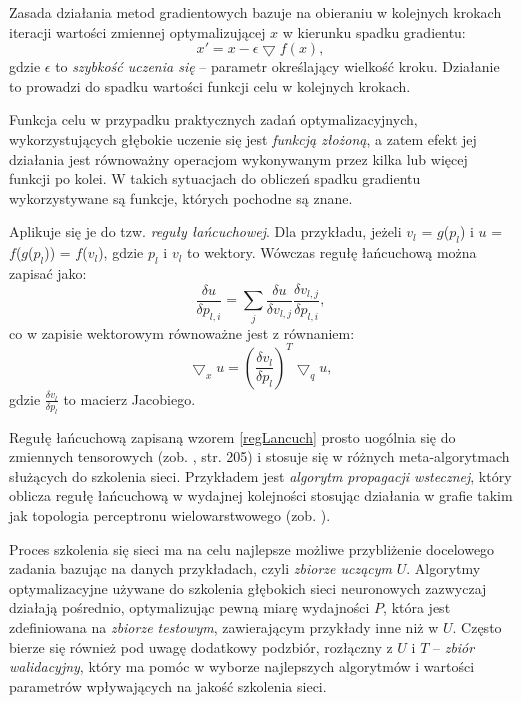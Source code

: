 Zasada działania metod gradientowych bazuje na obieraniu w kolejnych krokach iteracji wartości zmiennej optymalizującej $x$ w kierunku spadku gradientu:
\begin{equation}
x' = x - \epsilon \bigtriangledown f(x),
\end{equation} 
gdzie $\epsilon$ to \textit{szybkość uczenia się} -- parametr określający wielkość kroku. Działanie to prowadzi do spadku wartości funkcji celu w kolejnych krokach. 

Funkcja celu w przypadku praktycznych zadań optymalizacyjnych, wykorzystujących głębokie uczenie się jest \textit{funkcją złożoną}, a zatem efekt jej działania jest równoważny operacjom wykonywanym przez kilka lub więcej funkcji po kolei. \linebreak W takich sytuacjach do obliczeń spadku gradientu wykorzystywane są funkcje, których pochodne są znane.

Aplikuje się je do tzw. \textit{reguły łańcuchowej}. Dla przykładu, jeżeli $v_l$ = $g$($p_l$) i $u$ = $f$($g$($p_l$)) = $f$($v_l$), gdzie $p_l$ i $v_l$ to wektory. Wówczas regułę łańcuchową można zapisać jako:
\begin{equation}
\frac{\delta u}{\delta p_{l,i}} = \sum_{j} \frac{\delta u}{\delta v_{l,j}} \frac{\delta v_{l,j}}{\delta p_{l,i}}, 
\end{equation}
co w zapisie wektorowym równoważne jest z równaniem:
\begin{equation}
\label{regLancuch}
\bigtriangledown_x u = (\frac{\delta v_l}{\delta p_l})^T \bigtriangledown_q u, 
\end{equation}
gdzie $\frac{\delta v_l}{\delta p_l}$ to macierz Jacobiego. 

Regułę łańcuchową zapisaną wzorem \ref{regLancuch} prosto uogólnia się do zmiennych tensorowych (zob. \cite{Goodfellow-et-al-2016}, str. 205) i stosuje się w różnych meta-algorytmach służących \linebreak do szkolenia sieci. Przykładem jest \textit{algorytm propagacji wstecznej}, który oblicza regułę łańcuchową w wydajnej kolejności stosując działania w grafie takim jak topologia perceptronu wielowarstwowego (zob. \cite{Goodfellow-et-al-2016}).

Proces szkolenia się sieci ma na celu najlepsze możliwe przybliżenie docelowego zadania bazując na danych przykładach, czyli \textit{zbiorze uczącym} $U$. Algorytmy optymalizacyjne używane do szkolenia głębokich sieci neuronowych zazwyczaj działają pośrednio, optymalizując pewną miarę wydajności $P$, która jest zdefiniowana na \textit{zbiorze testowym}, zawierającym przykłady inne niż w $U$. Często bierze się również pod uwagę dodatkowy podzbiór, rozłączny z $U$ i $T$ -- \textit{zbiór walidacyjny}, który ma pomóc w wyborze najlepszych algorytmów i wartości parametrów wpływających na jakość szkolenia sieci.

